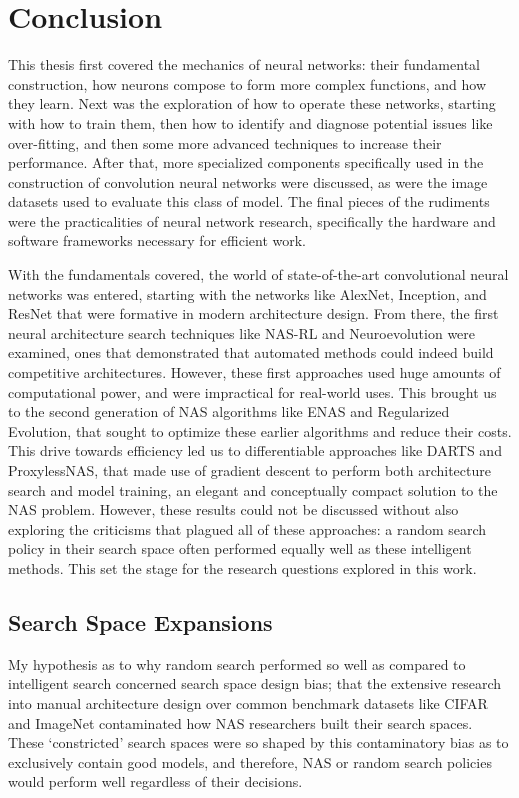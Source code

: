 
\graphicspath{{Chapters/conclusion/figures/}}

\chapter{Conclusion}
This thesis first covered the mechanics of neural networks: their fundamental construction, how neurons compose
to form more complex functions, and how they learn. Next was the exploration of how to operate these networks, starting
with how to train them, then how to identify and diagnose potential issues like over-fitting, and then some
more advanced techniques to increase their performance. After that, more specialized
components specifically used in the construction of convolution neural networks were discussed, as were the image datasets used to
evaluate this class of model. The final pieces of the rudiments were the practicalities of neural network research,
specifically the hardware and software frameworks necessary for efficient work.

With the fundamentals covered, the world of state-of-the-art convolutional neural networks was entered,
starting with the networks like AlexNet, Inception, and ResNet that were formative in modern architecture design. From there,
the first neural architecture search techniques like NAS-RL and Neuroevolution were examined, ones that
demonstrated that automated methods could indeed build competitive architectures. However, these first approaches
used huge amounts of computational power, and were impractical for real-world uses. This brought us to the second
generation of NAS algorithms like ENAS and Regularized Evolution, that sought to optimize these earlier algorithms
and reduce their costs. This drive towards efficiency led us to differentiable approaches like DARTS and ProxylessNAS,
that made use of gradient descent to perform both architecture search and model training, an elegant and conceptually compact
solution to the NAS problem. However, these results could not be discussed without also exploring the criticisms that plagued all of these approaches:
a random search policy in their search space often performed equally well as these intelligent methods. This set the stage
for the research questions explored in this work.
\vspace{-1em}
\section{Search Space Expansions}
My hypothesis as to why random search performed so well as compared to intelligent search concerned search space
design bias; that the extensive research into manual architecture design over common benchmark datasets like CIFAR and
ImageNet contaminated how NAS researchers built their search spaces. These `constricted' search spaces were so shaped
by this contaminatory bias as to exclusively contain good models, and therefore, NAS or random search policies would
perform well regardless of their decisions.
\vspace{-1em}
